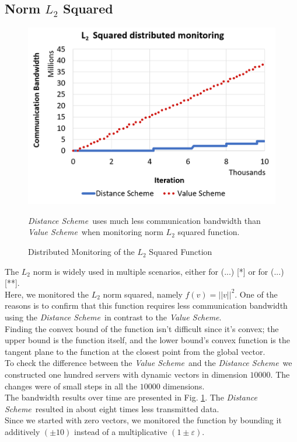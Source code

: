 \documentclass[10pt, conference]{IEEEtran}
\newcommand{\valueScheme}{\textit{Value Scheme}}
\newcommand{\distanceScheme}{\textit{Distance Scheme}}
\begin{document}
\subsection{Norm $L_2$ Squared} \label{L2SquaredExperiment}
\begin{figure}[t]
\includegraphics[width=\linewidth]{Pics/PNGs/L2NormCommunicationDiagram.png}
\caption{Distributed Monitoring of the $L_2$ Squared Function}
\medskip
\small
\distanceScheme \ uses much less communication bandwidth than \valueScheme \ when monitoring norm $L_2$ squared function.
\label{SphereMonitoring}
\end{figure} 
The $L_2$ norm is widely used in multiple scenarios, either for (...) [*] or for (...) [**]. \\
Here, we monitored the $L_2$ norm squared, namely ${f(v) = ||v||^2}$. One of the reasons is to confirm that this function requires less communication bandwidth using the \distanceScheme \ in contrast to the \valueScheme . \\
Finding the convex bound of the function isn't difficult since it's convex; the upper bound is the function itself, and the lower bound's convex function is the tangent plane to the function at the closest point from the global vector. \\
To check the difference between the \valueScheme \ and the \distanceScheme \ we constructed one hundred servers with dynamic vectors in dimension $\num[group-separator={,}]{10000}$. The changes were of small steps in all the $\num[group-separator={,}]{10000}$ dimensions. \\
The bandwidth results over time are presented in Fig. \ref{SphereMonitoring}. The \distanceScheme \ resulted in about eight times less transmitted data. \\
Since we started with zero vectors, we monitored the function by bounding it additively ${(\pm 10)}$ instead of a multiplicative ${(1 \pm \varepsilon)}$.
\end{document}
